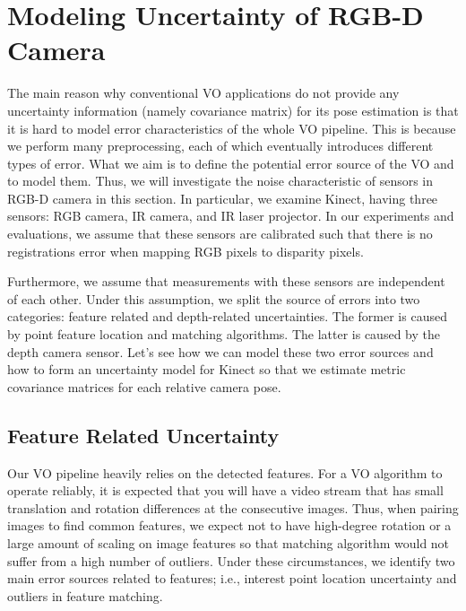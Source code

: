 \documentclass[a4paper]{report}
\numberwithin{figure}{section}
\begin{document}
\section{Modeling Uncertainty of RGB-D Camera} \label{sc_modeling_uncertainty_of_rgbd}

The main reason why conventional VO applications do not provide any uncertainty
information (namely covariance matrix) for its pose estimation is that it is
hard to model error characteristics of the whole VO pipeline.  This is because
we perform many preprocessing, each of which eventually introduces different
types of error. What we aim is to define the potential error source of the VO 
and
to model them. Thus, we will investigate the noise characteristic of sensors in
RGB-D camera in this section. In particular, we examine Kinect, having three
sensors: RGB camera, IR camera, and IR laser projector.  In our experiments and
evaluations, we assume that these sensors are calibrated such that there is no
registrations error when mapping RGB pixels to disparity pixels.

Furthermore, we assume that measurements with these sensors are independent of
each other.  Under this assumption, we split the source of errors into two
categories: feature related and depth-related uncertainties. The former is
caused by point feature location and matching algorithms. The latter is caused
by the depth camera sensor.  Let's see how we can model these two error sources
and how to form an uncertainty model for Kinect so that we estimate
metric covariance matrices for each relative camera pose.

\subsection{Feature Related Uncertainty} \label{sb_sc_pixel_uncertainty}

Our VO pipeline heavily relies on the detected features. For a VO algorithm to
operate reliably, it is expected that you will have a video stream that has
small translation and rotation differences at the consecutive images. Thus,
when pairing images to find common features, we expect not to have high-degree
rotation or a large amount of scaling on image features so that matching
algorithm would not suffer from a high number of outliers. Under these
circumstances, we identify two main error sources related to features; i.e.,
interest point location uncertainty and outliers in feature matching.
\end{document}
